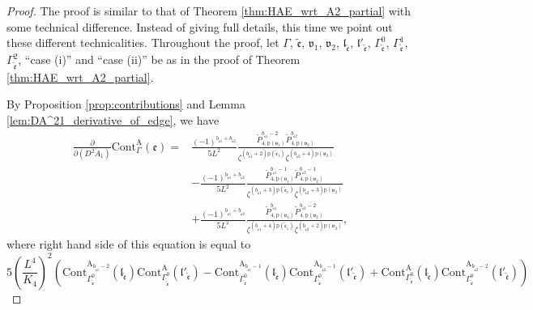 \documentclass[12pt]{amsart}
\numberwithin{equation}{section}
\begin{document}
\begin{proof}
The proof is similar to that of Theorem \ref{thm:HAE_wrt_A2_partial} with some technical difference. Instead of giving full details, this time we point out these different technicalities. Throughout the proof, let $\Gamma$, $\tilde{\mathfrak{e}}$, $\mathfrak{v}_1$, $\mathfrak{v}_2$, $\mathfrak{l}_{\tilde{\mathfrak{e}}}$, $\mathfrak{l}'_{\tilde{\mathfrak{e}}}$, $\Gamma_{\tilde{\mathfrak{e}}}^0$, $\Gamma_{\tilde{\mathfrak{e}}}^1$, $\Gamma_{\tilde{\mathfrak{e}}}^2$, ``case (i)'' and ``case (ii)'' be as in the proof of Theorem \ref{thm:HAE_wrt_A2_partial}.

By Proposition \ref{prop:contributions} and Lemma \ref{lem:DA^21_derivative_of_edge}, we have
\begin{equation}\label{eq:partial_wrt_DA21_in_proof}
\begin{aligned}
    \frac{\partial}{\partial (D^2A_1)}\mathrm{Cont}_{\Gamma}^{\mathrm{A}}(\mathfrak{e})
    =&\frac{(-1)^{b_{\tilde{\mathfrak{e}}1}+b_{\tilde{\mathfrak{e}}2}}}{5L^2}
    \frac{\widetilde{P}_{4,\mathrm{p}(\mathfrak{v}_1)}^{b_{\tilde{\mathfrak{e}}1}-2}\widetilde{P}_{4,\mathrm{p}(\mathfrak{v}_2)}^{b_{\tilde{\mathfrak{e}}2}}}{\zeta^{(b_{\tilde{\mathfrak{e}}1}+2)\mathrm{p}(\tilde{\mathfrak{e}}_1)}\zeta^{(b_{\tilde{\mathfrak{e}}2}+4)\mathrm{p}(\mathfrak{v}_2)}}\\
    &-\frac{(-1)^{b_{\tilde{\mathfrak{e}}1}+b_{\tilde{\mathfrak{e}}2}}}{5L^2}
    \frac{\widetilde{P}_{4,\mathrm{p}(\mathfrak{v}_1)}^{b_{\tilde{\mathfrak{e}}1}-1}\widetilde{P}_{4,\mathrm{p}(\mathfrak{v}_2)}^{b_{\tilde{\mathfrak{e}}2}-1}}{\zeta^{(b_{\tilde{\mathfrak{e}}1}+3)\mathrm{p}(\tilde{\mathfrak{e}}_1)}\zeta^{(b_{\tilde{\mathfrak{e}}2}+3)\mathrm{p}(\mathfrak{v}_2)}}\\
    &+\frac{(-1)^{b_{\tilde{\mathfrak{e}}1}+b_{\tilde{\mathfrak{e}}2}}}{5L^2}
    \frac{\widetilde{P}_{4,\mathrm{p}(\mathfrak{v}_1)}^{b_{\tilde{\mathfrak{e}}1}}\widetilde{P}_{4,\mathrm{p}(\mathfrak{v}_2)}^{b_{\tilde{\mathfrak{e}}2}-2}}{\zeta^{(b_{\tilde{\mathfrak{e}}1}+4)\mathrm{p}(\tilde{\mathfrak{e}}_1)}\zeta^{(b_{\tilde{\mathfrak{e}}2}+2)\mathrm{p}(\mathfrak{v}_2)}},
\end{aligned}
\end{equation}
where right hand side of this equation is equal to
\begin{equation*}
5\left(\frac{L^{4}}{K_{4}}\right)^2\left(
\mathrm{Cont}_{\Gamma_{\tilde{\mathfrak{e}}}^0}^{\mathrm{A}_{b_{\tilde{\mathfrak{e}}1}-2}}(\mathfrak{l}_{\tilde{\mathfrak{e}}})\mathrm{Cont}_{\Gamma_{\tilde{\tilde{\mathfrak{e}}}}^0}^{\mathrm{A}}(\mathfrak{l}'_{\tilde{\mathfrak{e}}})-\mathrm{Cont}_{\Gamma_{\tilde{\mathfrak{e}}}^0}^{\mathrm{A}_{b_{\tilde{\mathfrak{e}}1}-1}}(\mathfrak{l}_{\tilde{\mathfrak{e}}})\mathrm{Cont}_{\Gamma_{\tilde{\mathfrak{e}}}^0}^{\mathrm{A}_{b_{\tilde{\mathfrak{e}}2}-1}}(\mathfrak{l}'_{\tilde{\mathfrak{e}}})+\mathrm{Cont}_{\Gamma_{\tilde{\mathfrak{e}}}^0}^{\mathrm{A}}(\mathfrak{l}_{\tilde{\mathfrak{e}}})\mathrm{Cont}_{\Gamma_{\tilde{\mathfrak{e}}}^0}^{\mathrm{A}_{b_{\tilde{\mathfrak{e}}2}-2}}(\mathfrak{l}'_{\tilde{\mathfrak{e}}})\right)

\end{equation*}
\end{proof}
\end{document}
